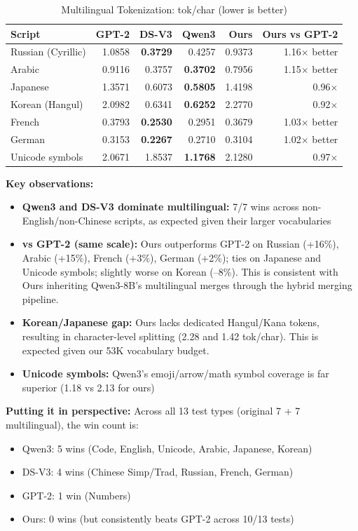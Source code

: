 \begin{table}[h]
    \centering
    \caption{Multilingual Tokenization: tok/char (lower is better)}
    \begin{tabular}{lrrrrr}
        \toprule
        \textbf{Script} & \textbf{GPT-2} & \textbf{DS-V3} & \textbf{Qwen3} & \textbf{Ours} & \textbf{Ours vs GPT-2} \\
        \midrule
        Russian (Cyrillic) & 1.0858 & \textbf{0.3729} & 0.4257 & 0.9373 & 1.16$\times$ better \\
        Arabic & 0.9116 & 0.3757 & \textbf{0.3702} & 0.7956 & 1.15$\times$ better \\
        Japanese & 1.3571 & 0.6073 & \textbf{0.5805} & 1.4198 & 0.96$\times$ \\
        Korean (Hangul) & 2.0982 & 0.6341 & \textbf{0.6252} & 2.2770 & 0.92$\times$ \\
        French & 0.3793 & \textbf{0.2530} & 0.2951 & 0.3679 & 1.03$\times$ better \\
        German & 0.3153 & \textbf{0.2267} & 0.2710 & 0.3104 & 1.02$\times$ better \\
        Unicode symbols & 2.0671 & 1.8537 & \textbf{1.1768} & 2.1280 & 0.97$\times$ \\
        \bottomrule
    \end{tabular}
\end{table}

\textbf{Key observations:}
\begin{itemize}
    \item \textbf{Qwen3 and DS-V3 dominate multilingual:} 7/7 wins across non-English/non-Chinese scripts, as expected given their larger vocabularies
    \item \textbf{vs GPT-2 (same scale):} Ours outperforms GPT-2 on Russian (+16\%), Arabic (+15\%), French (+3\%), German (+2\%); ties on Japanese and Unicode symbols; slightly worse on Korean (--8\%). This is consistent with Ours inheriting Qwen3-8B's multilingual merges through the hybrid merging pipeline.
    \item \textbf{Korean/Japanese gap:} Ours lacks dedicated Hangul/Kana tokens, resulting in character-level splitting (2.28 and 1.42 tok/char). This is expected given our 53K vocabulary budget.
    \item \textbf{Unicode symbols:} Qwen3's emoji/arrow/math symbol coverage is far superior (1.18 vs 2.13 for ours)
\end{itemize}

\textbf{Putting it in perspective:} Across all 13 test types (original 7 + 7 multilingual), the win count is:
\begin{itemize}
    \item Qwen3: 5 wins (Code, English, Unicode, Arabic, Japanese, Korean)
    \item DS-V3: 4 wins (Chinese Simp/Trad, Russian, French, German)
    \item GPT-2: 1 win (Numbers)
    \item Ours: 0 wins (but consistently beats GPT-2 across 10/13 tests)
\end{itemize}

